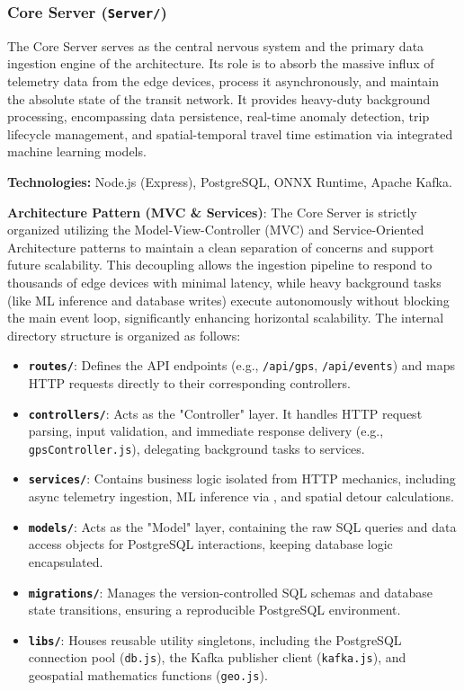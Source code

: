 \documentclass[a4paper]{article}
\begin{document}
\subsubsection{Core Server (\texttt{Server/})}
The Core Server serves as the central nervous system and the primary data ingestion engine of the architecture. Its role is to absorb the massive influx of telemetry data from the edge devices, process it asynchronously, and maintain the absolute state of the transit network. It provides heavy-duty background processing, encompassing data persistence, real-time anomaly detection, trip lifecycle management, and spatial-temporal travel time estimation via integrated machine learning models.

\textbf{Technologies:} Node.js (Express), PostgreSQL, ONNX Runtime, Apache Kafka.
\medskip

\textbf{Architecture Pattern (MVC \& Services)}: The Core Server is strictly organized utilizing the Model-View-Controller (MVC) and Service-Oriented Architecture patterns to maintain a clean separation of concerns and support future scalability. This decoupling allows the ingestion pipeline to respond to thousands of edge devices with minimal latency, while heavy background tasks (like ML inference and database writes) execute autonomously without blocking the main event loop, significantly enhancing horizontal scalability. The internal directory structure is organized as follows:
\begin{itemize}
    \item \textbf{\texttt{routes/}}: Defines the API endpoints (e.g., \texttt{/api/gps}, \texttt{/api/events}) and maps HTTP requests directly to their corresponding controllers.
    \item \textbf{\texttt{controllers/}}: Acts as the "Controller" layer. It handles HTTP request parsing, input validation, and immediate response delivery (e.g., \texttt{gpsController.js}), delegating background tasks to services.
    \item \textbf{\texttt{services/}}: Contains business logic isolated from HTTP mechanics, including async telemetry ingestion, ML inference via , and spatial detour calculations.
    \item \textbf{\texttt{models/}}: Acts as the "Model" layer, containing the raw SQL queries and data access objects for PostgreSQL interactions, keeping database logic encapsulated.
    \item \textbf{\texttt{migrations/}}: Manages the version-controlled SQL schemas and database state transitions, ensuring a reproducible PostgreSQL environment.
    \item \textbf{\texttt{libs/}}: Houses reusable utility singletons, including the PostgreSQL connection pool (\texttt{db.js}), the Kafka publisher client (\texttt{kafka.js}), and geospatial mathematics functions (\texttt{geo.js}).
\end{itemize}
\medskip
\end{document}
